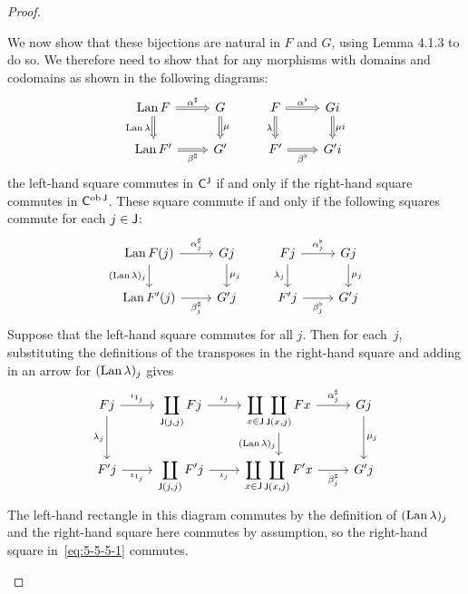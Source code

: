 \documentclass[../../solutions]{subfiles}
\begin{document}
\begin{proof}
\begin{enumerate}[label=(\roman*)]
    We now show that these bijections are natural in $F$ and $G$,
    using Lemma 4.1.3 to do so.  We therefore need to show that for
    any morphisms with domains and codomains as shown in the following
    diagrams:
    $$
    \begin{tikzcd}[arrows=Rightarrow]
      \Lan F \ar[r, "\alpha^\sharp"] \ar[d, "\Lan\lambda"']
      & G \ar[d, "\mu"]
      & F \ar[r, "\alpha^\flat"] \ar[d, "\lambda"']
      & Gi \ar[d, "\mu i"]
      \\
      \Lan F' \ar[r, "\beta^\sharp"']
      & G'
      & F' \ar[r, "\beta^\flat"']
      & G'i
    \end{tikzcd}
    $$
    the left-hand square commutes in ${\mathsf{C}}^{\mathsf{J}}$ if and only if the
    right-hand square commutes in ${\mathsf{C}}^{\operatorname{ob}{\mathsf{J}}}$.  These square
    commute if and only if the following squares commute for each
    $j\in{\mathsf{J}}$:
    \begin{equation}
      \label{eq:5-5-5-1}
      \begin{tikzcd}
        \Lan F(j) \ar[r, "\alpha^\sharp_j"] \ar[d, "(\Lan\lambda)_j"']
        & Gj \ar[d, "\mu_j"]
        & Fj \ar[r, "\alpha^\flat_j"] \ar[d, "\lambda_j"']
        & Gj \ar[d, "\mu_j"]
        \\
        \Lan F'(j) \ar[r, "\beta^\sharp_j"']
        & G'j
        & F'j \ar[r, "\beta^\flat_j"']
        & G'j
      \end{tikzcd}
    \end{equation}
    Suppose that the left-hand square commutes for all $j$.  Then for
    each~$j$, substituting the definitions of the transposes in the
    right-hand square and adding in an arrow for $(\operatorname{Lan} \lambda)_j$
    gives
    $$
    \begin{tikzcd}
      Fj \ar[r, "\iota_{1_j}"] \ar[d, "\lambda_j"']
      & \displaystyle \coprod_{\sJ(j,j)} Fj \ar[r, "\iota_j"]
      & \displaystyle \coprod_{x\in\sJ\vphantom{j}}\coprod_{\sJ(x,j)} Fx
      \ar[r, "\alpha^\sharp_j"]
      \ar[d, "(\Lan \lambda)_j"']
      & Gj \ar[d, "\mu_j"]
      \\
      F'j \ar[r, "\iota_{1_j}"']
      & \displaystyle \coprod_{\sJ(j,j)} F'j \ar[r, "\iota_j"']
      & \displaystyle \coprod_{x\in\sJ\vphantom{j}}\coprod_{\sJ(x,j)} F'x
      \ar[r, "\beta^\sharp_j"']
      & G'j
    \end{tikzcd}
    $$
    The left-hand rectangle in this diagram commutes by the definition of
    $(\operatorname{Lan}\lambda)_j$ and the right-hand square here commutes by
    assumption, so the right-hand square in~\eqref{eq:5-5-5-1} commutes.


\end{enumerate}
\end{proof}
\end{document}
